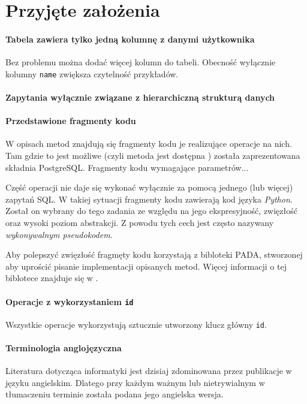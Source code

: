 \section{Przyjęte założenia}

\paragraph{Tabela zawiera tylko jedną kolumnę z danymi użytkownika} 
Bez problemu można dodać więcej kolumn do tabeli. Obecność wyłącznie kolumny \texttt{name} zwiększa czytelność przykładów.
\paragraph{Zapytania wyłącznie związane z hierarchiczną strukturą danych} 

\paragraph{Przedstawione fragmenty kodu} 
W opisach metod znajdują się fragmenty kodu je realizujące operacje na nich. 
Tam gdzie to jest możliwe (czyli metoda jest dostępna ) została zaprezentowana składnia PostgreSQL.
Fragmenty kodu  wymagające parametrów...

Część operacji nie daje się wykonać wyłącznie za pomocą jednego (lub więcej) zapytań SQL.
W takiej sytuacji fragmenty kodu zawierają kod języka \emph{Python}.
Został on wybrany do tego zadania ze względu na jego ekspresyjność, zwięzłość oraz wysoki poziom abstrakcji.
Z powodu tych cech jest często nazywany \emph{wykonywalnym pseudokodem}.

Aby polepszyć zwięzłość fragmęty kodu korzystają z bibloteki PADA, stworzonej aby uprościć pisanie implementacji opisanych metod. 
Więcej informacji o tej biblotece znajduje się w .

\paragraph{Operacje z wykorzystaniem \texttt{id}} Wszystkie operacje wykorzystują sztucznie utworzony klucz główny \texttt{id}. 

\paragraph{Terminologia anglojęzyczna} 
Literatura dotycząca informatyki jest dzisiaj zdominowana przez publikacje w języku angielskim. Dlatego przy każdym ważnym lub nietrywialnym w tłumaczeniu terminie została podana jego angielska wersja. 


